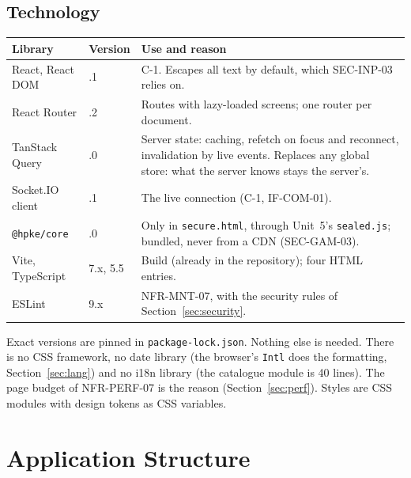 \documentclass[11pt,a4paper]{article}
\newenvironment{dtable}[1]{\small\begin{longtable}{#1}}{\end{longtable}}
\begin{document}
\subsection{Technology}
\begin{dtable}{@{}>{\raggedright\arraybackslash}p{4.0cm}>{\raggedright\arraybackslash}p{2.4cm}>{\raggedright\arraybackslash}p{8.8cm}@{}}
\toprule
\textbf{Library} & \textbf{Version} & \textbf{Use and reason} \\ \midrule \endhead
React, React DOM & 18.3.1 & C-1. Escapes all text by default, which SEC-INP-03 relies on. \\
React Router & 6.26.2 & Routes with lazy-loaded screens; one router per document. \\
TanStack Query & 5.59.0 & Server state: caching, refetch on focus and reconnect, invalidation by live events. Replaces any global store: what the server knows stays the server's. \\
Socket.IO client & 4.8.1 & The live connection (C-1, IF-COM-01). \\
\texttt{@hpke/core} & 1.9.0 & Only in \texttt{secure.html}, through Unit~5's \texttt{sealed.js}; bundled, never from a CDN (SEC-GAM-03). \\
Vite, TypeScript & 7.x, 5.5 & Build (already in the repository); four HTML entries. \\
ESLint & 9.x & NFR-MNT-07, with the security rules of Section~\ref{sec:security}. \\
\bottomrule
\end{dtable}
Exact versions are pinned in \texttt{package-lock.json}. Nothing else is needed. There is no CSS framework, no date library (the browser's \texttt{Intl} does the formatting, Section~\ref{sec:lang}) and no i18n library (the catalogue module is 40 lines). The page budget of NFR-PERF-07 is the reason (Section~\ref{sec:perf}). Styles are CSS modules with design tokens as CSS variables.

\section{Application Structure}
\label{sec:structure}
\end{document}
